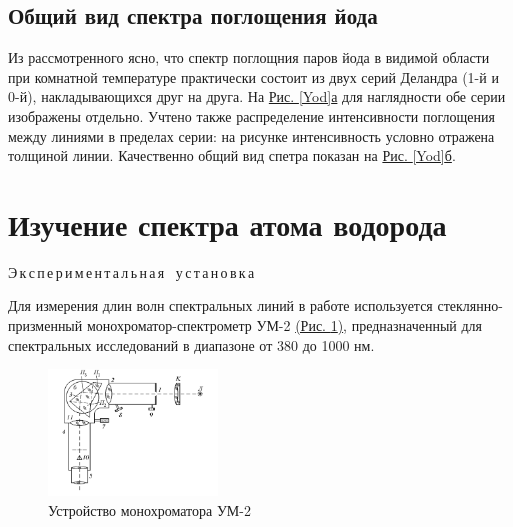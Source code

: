 \documentclass{article}
\begin{document}
\subsection*{Общий вид спектра поглощения йода}
Из рассмотренного ясно, что спектр поглощния паров йода в видимой области при комнатной температуре практически состоит из двух серий Деландра (1-й и 0-й), накладывающихся друг на друга. На \hyperref[Yod]{Рис. \ref*{Yod}а} для наглядности обе серии изображены отдельно. Учтено также распределение интенсивности поглощения между линиями в пределах серии: на рисунке интенсивность условно отражена толщиной линии. Качественно общий вид спетра показан на \hyperref[Yod]{Рис. \ref*{Yod}б}. 




\section{Изучение спектра атома водорода}
Э\,к\,с\,п\,е\,р\,и\,м\,е\,н\,т\,а\,л\,ь\,н\,а\,я  \, у\,с\,т\,а\,н\,о\,в\,к\,а

Для измерения длин волн спектральных линий в работе используется стеклянно-призменный монохроматор-спектрометр УМ-2 \hyperref[UM-2]{(Рис. \ref*{UM-2})}, предназначенный для спектральных исследований в диапазоне от 380 до 1000 нм. 

\begin{figure}
\begin{center}
\includegraphics[width=0.4\textwidth]{Screenshot 2023-10-07 at 1.59.20 PM.png}
\caption{Устройство монохроматора УМ-2}
\label{UM-2}
\end{center}
\end{figure}
\end{document}
